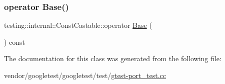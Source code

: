 \subsubsection{\texorpdfstring{operator Base()}{operator Base()}}
{\footnotesize\ttfamily testing\+::internal\+::\+Const\+Castable\+::operator \hyperlink{class_base}{Base} (\begin{DoxyParamCaption}{ }\end{DoxyParamCaption}) const\hspace{0.3cm}{\ttfamily [inline]}}



The documentation for this class was generated from the following file\+:\begin{DoxyCompactItemize}
\item 
vendor/googletest/googletest/test/\hyperlink{gtest-port__test_8cc}{gtest-\/port\+\_\+test.\+cc}\end{DoxyCompactItemize}
